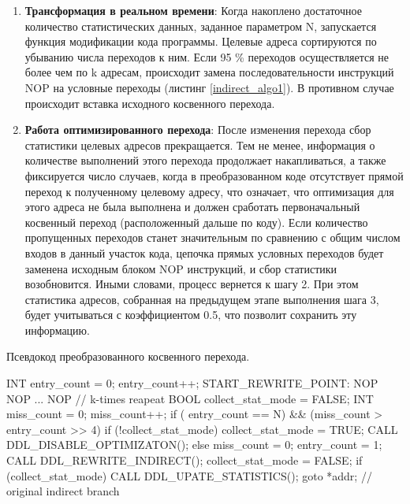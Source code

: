 \begin{enumerate}
 	\item \textbf{Трансформация в реальном времени}: Когда накоплено достаточное количество статистических данных, заданное параметром N, запускается функция модификации кода программы. Целевые адреса сортируются по убыванию числа переходов к ним. Если 95 \% переходов осуществляется не более чем по k адресам, происходит замена последовательности инструкций NOP на условные переходы (листинг \ref{indirect_algo1}). В противном случае происходит вставка исходного косвенного перехода.
	\item \textbf{Работа оптимизированного перехода}: После изменения перехода сбор статистики целевых адресов прекращается. Тем не менее, информация о количестве выполнений этого перехода продолжает накапливаться, а также фиксируется число случаев, когда в преобразованном коде отсутствует прямой переход к полученному целевому адресу, что означает, что оптимизация для этого адреса не была выполнена и должен сработать первоначальный косвенный переход (расположенный дальше по коду). Если количество пропущенных переходов станет значительным по сравнению с общим числом входов в данный участок кода, цепочка прямых условных переходов будет заменена исходным блоком NOP инструкций, и сбор статистики возобновится. Иными словами, процесс вернется к шагу 2. При этом статистика адресов, собранная на предыдущем этапе выполнения шага 3, будет учитываться с коэффициентом 0.5, что позволит сохранить эту информацию.
 \end{enumerate}

\begin{ListingEnv}[!h]
	\captiondelim{ } %
	\caption{Псевдокод преобразованного косвенного перехода.}\label{indirect_algo1}
	
	\begin{Verb}
		
		INT entry_count = 0;
		entry_count++;
		START_REWRITE_POINT:
		NOP
		NOP
		...
		NOP // k-times reapeat
		BOOL collect_stat_mode = FALSE;
		INT miss_count = 0;
		miss_count++;
		if ( entry_count == N)
		&& (miss_count > entry_count >> 4) {
			if (!collect_stat_mode){
				collect_stat_mode = TRUE;
				CALL DDL_DISABLE_OPTIMIZATON();
			} else {
				miss_count = 0;
				entry_count = 1;
				CALL DDL_REWRITE_INDIRECT();
				collect_stat_mode = FALSE;
			}
		}
		if (collect_stat_mode) {
			CALL DDL_UPATE_STATISTICS();
		}
		goto *addr; // original indirect branch
		
	\end{Verb}
\end{ListingEnv} 



